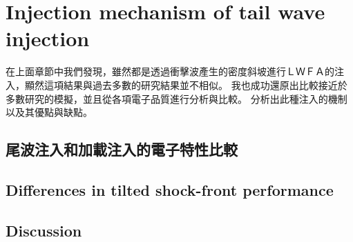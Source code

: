 
\chapter{Injection mechanism of tail wave injection}
在上面章節中我們發現，雖然都是透過衝擊波產生的密度斜坡進行ＬＷＦＡ的注入，顯然這項結果與過去多數的研究結果並不相似。
我也成功還原出比較接近於多數研究的模擬，並且從各項電子品質進行分析與比較。
分析出此種注入的機制以及其優點與缺點。
\section{尾波注入和加載注入的電子特性比較}%



\section{Differences in tilted shock-front performance}


\section{Discussion}
